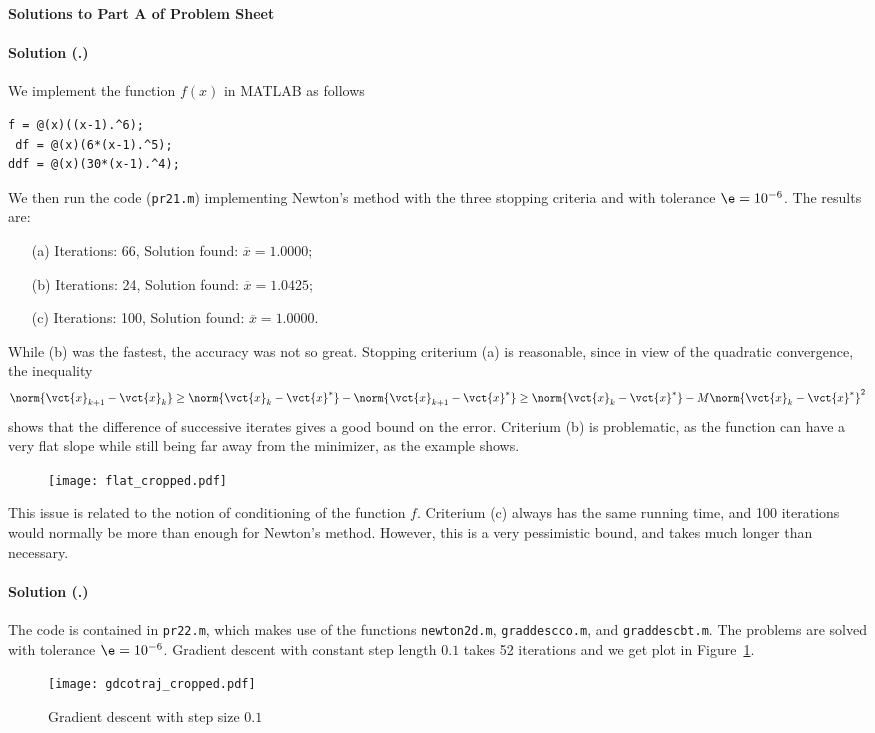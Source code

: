 \documentclass{article}
\newcounter{problemSheetNumber}
\newcounter{problems}
\renewcommand{\solution}[1]{\paragraph{Solution (\theproblemSheetNumber.\theproblems)}\addtocounter{problems}{1}\label{#1}}
\begin{document}
 
\begin{center}
{\Large {\bf Solutions to Part A of Problem Sheet \theproblemSheetNumber}}
\end{center}

\solution{pr:1} We implement the function $f(x)$ in MATLAB as follows
\begin{lstlisting}[frame=single]
  f = @(x)((x-1).^6);
 df = @(x)(6*(x-1).^5);
ddf = @(x)(30*(x-1).^4);
\end{lstlisting}
We then run the code ({\tt pr21.m}) implementing Newton's method with the three stopping criteria and with tolerance $\e=10^{-6}$. The results are:
\begin{itemize}
 \item[(a)] Iterations: 66, Solution found: $\overline{x}=1.0000$;
 \item[(b)] Iterations: 24, Solution found: $\overline{x}=1.0425$;
 \item[(c)] Iterations: 100, Solution found: $\overline{x}=1.0000$.
\end{itemize}
While (b) was the fastest, the accuracy was not so great. Stopping criterium (a) is reasonable, since in view of the quadratic convergence, the inequality
\begin{equation*}
 \norm{\vct{x}_{k+1}-\vct{x}_k}\geq \norm{\vct{x}_k-\vct{x}^*}-\norm{\vct{x}_{k+1}-\vct{x}^*} \geq \norm{\vct{x}_k-\vct{x}^*}-M\norm{\vct{x}_{k}-\vct{x}^*}^2
\end{equation*}
shows that the difference of successive iterates gives a good bound on the error. Criterium (b) is problematic, as the function can have a very flat slope while still being far away from the minimizer, as the example shows.
\begin{figure}[h!]
 \centering
 \texttt{[image: flat\_cropped.pdf]}
\end{figure}
This issue is related to the notion of conditioning of the function $f$. Criterium (c) always has the same running time, and 100 iterations would normally be more than enough for Newton's method. However, this is a very pessimistic bound, and takes much longer than necessary.

\solution{pr:2} The code is contained in {\tt pr22.m}, which makes use of the functions {\tt newton2d.m}, {\tt graddescco.m}, and {\tt graddescbt.m}. The problems are solved with tolerance $\e=10^{-6}$. Gradient descent with constant step length $0.1$ takes 52 iterations and we get plot in Figure~\ref{fig:1}.

\begin{figure}[h!]
 \centering
 \texttt{[image: gdcotraj\_cropped.pdf]}
 \caption{Gradient descent with step size $0.1$}\label{fig:1}
\end{figure}
\end{document}
